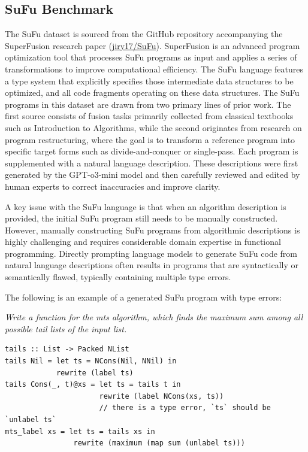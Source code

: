 \documentclass[manuscript,screen]{acmart}
\begin{document}
 \subsection{SuFu Benchmark}

The SuFu dataset is sourced from the GitHub repository accompanying the SuperFusion research paper (\href{https://github.com/jiry17/SuFu}{jiry17/SuFu}). SuperFusion is an advanced program optimization tool that processes SuFu programs as input and applies a series of transformations to improve computational efficiency. 
The SuFu language features a type system that explicitly specifies those intermediate data structures to be optimized, and all code fragments operating on these data structures.
The SuFu programs in this dataset are drawn from two primary lines of prior work. The first source consists of fusion tasks primarily collected from classical textbooks such as Introduction to Algorithms, while the second originates from research on program restructuring, where the goal is to transform a reference program into specific target forms such as divide-and-conquer or single-pass. 
Each program is supplemented with a natural language description. These descriptions were first generated by the GPT-o3-mini model and then carefully reviewed and edited by human experts to correct inaccuracies and improve clarity.

A key issue with the SuFu language is that when an algorithm description is provided, the initial SuFu program still needs to be manually constructed.
However, manually constructing SuFu programs from algorithmic descriptions is highly challenging and requires considerable domain expertise in functional programming. 
Directly prompting language models to generate SuFu code from natural language descriptions often results in programs that are syntactically or semantically flawed, typically containing multiple type errors. 

The following is an example of    {\color{revblue}a generated SuFu program } with type errors:
\begin{tcolorbox}[
    colback=gray!5,
    colframe=black,
    boxrule=0.5pt,
    arc=2pt,
    left=8pt,
    right=8pt,
    top=8pt,
    bottom=8pt,
    title=Natural Language Prompt
]
\textit{Write a function for the mts algorithm, which finds the maximum sum among all possible tail lists of the input list.}
\end{tcolorbox}
\begin{tcolorbox}[
    colback=gray!5,
    colframe=black,
    boxrule=0.5pt,
    arc=2pt
]
\begin{Verbatim}[fontsize=\small, xleftmargin=1em]
tails :: List -> Packed NList
tails Nil = let ts = NCons(Nil, NNil) in
            rewrite (label ts)
tails Cons(_, t)@xs = let ts = tails t in
                      rewrite (label NCons(xs, ts))
                      // there is a type error, `ts` should be `unlabel ts`
mts_label xs = let ts = tails xs in
                rewrite (maximum (map sum (unlabel ts)))
\end{Verbatim}
\end{tcolorbox}
\end{document}
